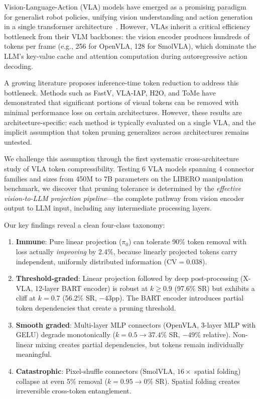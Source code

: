 \documentclass[letterpaper]{article}
\begin{document}
Vision-Language-Action (VLA) models have emerged as a promising paradigm for generalist robot policies, unifying vision understanding and action generation in a single transformer architecture~\cite{brohan2023rt2,kim2024openvla,black2024pi0}. However, VLAs inherit a critical efficiency bottleneck from their VLM backbones: the vision encoder produces hundreds of tokens per frame (e.g., 256 for OpenVLA, 128 for SmolVLA), which dominate the LLM's key-value cache and attention computation during autoregressive action decoding.

A growing literature proposes inference-time token reduction to address this bottleneck. Methods such as FastV, VLA-IAP, H2O, and ToMe have demonstrated that significant portions of visual tokens can be removed with minimal performance loss on certain architectures. However, these results are architecture-specific: each method is typically evaluated on a single VLA, and the implicit assumption that token pruning generalizes across architectures remains untested.

We challenge this assumption through the first systematic cross-architecture study of VLA token compressibility. Testing 6 VLA models spanning 4 connector families and sizes from 450M to 7B parameters on the LIBERO manipulation benchmark, we discover that pruning tolerance is determined by the \emph{effective vision-to-LLM projection pipeline}---the complete pathway from vision encoder output to LLM input, including any intermediate processing layers.

Our key findings reveal a clean four-class taxonomy:
\begin{enumerate}
    \item \textbf{Immune}: Pure linear projection ($\pi_0$) can tolerate 90\% token removal with loss actually \emph{improving} by 2.4\%, because linearly projected tokens carry independent, uniformly distributed information (CV${}=0.038$).
    \item \textbf{Threshold-graded}: Linear projection followed by deep post-processing (X-VLA, 12-layer BART encoder) is robust at $k \geq 0.9$ (97.6\% SR) but exhibits a cliff at $k=0.7$ (56.2\% SR, $-43$pp). The BART encoder introduces partial token dependencies that create a pruning threshold.
    \item \textbf{Smooth graded}: Multi-layer MLP connectors (OpenVLA, 3-layer MLP with GELU) degrade monotonically ($k=0.5 \to 37.4\%$ SR, $-49\%$ relative). Non-linear mixing creates partial dependencies, but tokens remain individually meaningful.
    \item \textbf{Catastrophic}: Pixel-shuffle connectors (SmolVLA, $16\times$ spatial folding) collapse at even 5\% removal ($k=0.95 \to 0\%$ SR). Spatial folding creates irreversible cross-token entanglement.
\end{enumerate}
\end{document}
